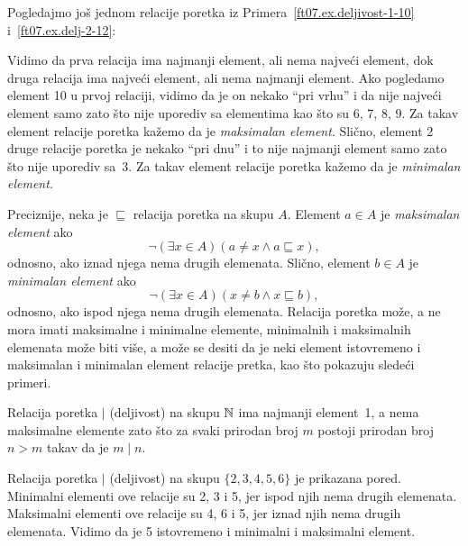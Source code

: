 \bigskip

Pogledajmo jo\v s jednom relacije poretka iz Primera~\ref{ft07.ex.deljivost-1-10} i~\ref{ft07.ex.delj-2-12}:
\begin{center}
    
    \hspace*{2cm}
    
\end{center}
Vidimo da prva relacija ima najmanji element, ali nema najve\'ci element, dok druga relacija ima najve\'ci element, ali nema
najmanji element. Ako pogledamo element 10 u prvoj relaciji, vidimo da je on nekako \enquote{pri vrhu} i da nije najve\'ci element samo
zato \v sto nije uporediv sa elementima kao \v sto su 6, 7, 8, 9. Za takav element relacije poretka ka\v zemo da je
\emph{maksimalan element}. Sli\v cno, element 2 druge relacije poretka je nekako \enquote{pri dnu} i to nije najmanji element
samo zato \v sto nije uporediv sa~3. Za takav element relacije poretka ka\v zemo da je \emph{minimalan element}.

Preciznije, neka je $\sqsubseteq$ relacija poretka na skupu $A$. Element $a \in A$ je \emph{maksimalan element} ako
$$
  \lnot(\exists x \in A)(a \ne x \land a \sqsubseteq x),
$$
odnosno, ako iznad njega nema drugih elemenata. Sli\v cno, element $b \in A$ je \emph{minimalan element} ako
$$
  \lnot(\exists x \in A)(x \ne b \land x \sqsubseteq b),
$$
odnosno, ako ispod njega nema drugih elemenata. Relacija poretka mo\v ze, a ne mora imati maksimalne i minimalne elemente,
minimalnih i maksimalnih elemenata mo\v ze biti vi\v se, a mo\v ze se desiti da je neki element istovremeno i maksimalan
i minimalan element relacije pretka, kao \v sto pokazuju slede\'ci primeri.

\begin{EX}
  Relacija poretka $\mid$ (deljivost) na skupu $\mathbb{N}$ ima najmanji element~1, a nema maksimalne elemente zato \v sto za svaki
  prirodan broj $m$ postoji prirodan broj $n > m$ takav da je $m \mid n$.
\end{EX}

\bigskip

\noindent
\begin{minipage}{3in}
  \begin{EX}
    Relacija poretka $|$ (deljivost) na skupu $\{2, 3, 4, 5, 6\}$ je prikazana pored. Minimalni elementi ove relacije
    su 2, 3 i 5, jer ispod njih nema drugih elemenata. Maksimalni elementi ove relacije su 4, 6 i 5, jer iznad njih nema
    drugih elemenata. Vidimo da je 5 istovremeno i minimalni i maksimalni element.
  \end{EX}
\end{minipage}
\hfill
\begin{minipage}{2.5in}
  \begin{center}
    
  \end{center}
\end{minipage}

